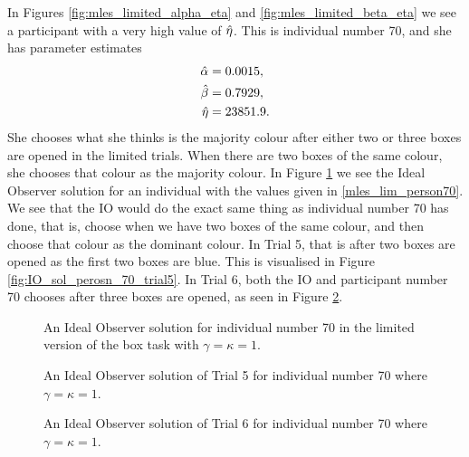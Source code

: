 In Figures \ref{fig:mles_limited_alpha_eta} and \ref{fig:mles_limited_beta_eta} we see a participant with a very high value of $\hat{\eta}$. This is individual number 70, and she has  parameter estimates
\begin{equation}
\label{mles_lim_person70}
    \begin{aligned}
        \hat{\alpha} &= 0.0015,\\
        \hat{\beta} &= 0.7929,\\
        \hat{\eta} &= 23851.9.
    \end{aligned}
\end{equation}
She chooses what she thinks is the majority colour after either two or three boxes are opened in the limited trials. When there are two boxes of the same colour, she chooses that colour as the majority colour. In Figure \ref{fig:IO_sol_person_70} we see the Ideal Observer solution for an individual with the values given in \eqref{mles_lim_person70}. We see that the IO would do the exact same thing as individual number 70 has done, that is, choose when we have two boxes of the same colour, and then choose that colour as the dominant colour. In Trial 5, that is after two boxes are opened as the first two boxes are blue. This is visualised in Figure \ref{fig:IO_sol_perosn_70_trial5}. In Trial 6, both the IO and participant number 70 chooses after three boxes are opened, as seen in Figure \ref{fig:IO_sol_person70_trial6}.
\begin{figure}
    \centering
    \scalebox{0.7}{}
    \caption[Ideal Observer solution individual 70, limited. $\gamma=\kappa=1$]{An Ideal Observer solution for individual number 70 in the limited version of the box task with $\gamma=\kappa=1$.}
    \label{fig:IO_sol_person_70}
\end{figure}

\begin{figure}
    \centering
    \begin{minipage}{0.48\textwidth}
        \centering
        \scalebox{0.7}{}
        \caption[Ideal Observer solution individual 70 in trial 5. $\gamma=\kappa=1$]{An Ideal Observer solution of Trial 5 for individual number 70 where $\gamma=\kappa=1$.}
        \label{fig:IO_sol_perosn_70_trial5}
    \end{minipage}
    \hfill
    \begin{minipage}{0.48\textwidth}
        \centering
        \scalebox{0.7}{}
        \caption[Ideal Observer solution individual 70 in trial 6. $\gamma=\kappa=1$]{An Ideal Observer solution of Trial 6 for individual number 70 where $\gamma=\kappa=1$.}
        \label{fig:IO_sol_person70_trial6}
    \end{minipage}
\end{figure}

